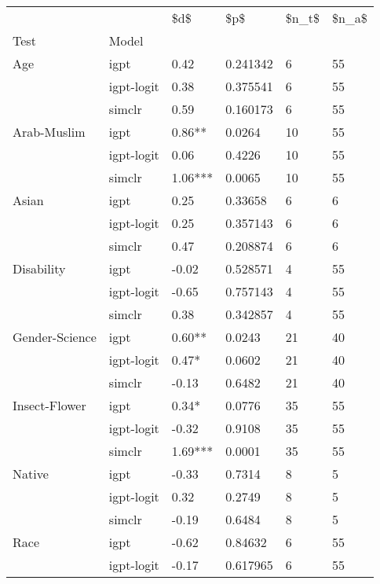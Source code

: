\begin{tabular}{llllll}
\toprule
       &        &      \$d\$ &         \$p\$ & \$n\_t\$ & \$n\_a\$ \\
Test & Model &          &             &       &       \\
\midrule
Age & igpt &     0.42 &    0.241342 &     6 &    55 \\
       & igpt-logit &     0.38 &    0.375541 &     6 &    55 \\
       & simclr &     0.59 &    0.160173 &     6 &    55 \\
Arab-Muslim & igpt &   0.86** &      0.0264 &    10 &    55 \\
       & igpt-logit &     0.06 &      0.4226 &    10 &    55 \\
       & simclr &  1.06*** &      0.0065 &    10 &    55 \\
Asian & igpt &     0.25 &     0.33658 &     6 &     6 \\
       & igpt-logit &     0.25 &    0.357143 &     6 &     6 \\
       & simclr &     0.47 &    0.208874 &     6 &     6 \\
Disability & igpt &    -0.02 &    0.528571 &     4 &    55 \\
       & igpt-logit &    -0.65 &    0.757143 &     4 &    55 \\
       & simclr &     0.38 &    0.342857 &     4 &    55 \\
Gender-Science & igpt &   0.60** &      0.0243 &    21 &    40 \\
       & igpt-logit &    0.47* &      0.0602 &    21 &    40 \\
       & simclr &    -0.13 &      0.6482 &    21 &    40 \\
Insect-Flower & igpt &    0.34* &      0.0776 &    35 &    55 \\
       & igpt-logit &    -0.32 &      0.9108 &    35 &    55 \\
       & simclr &  1.69*** &      0.0001 &    35 &    55 \\
Native & igpt &    -0.33 &      0.7314 &     8 &     5 \\
       & igpt-logit &     0.32 &      0.2749 &     8 &     5 \\
       & simclr &    -0.19 &      0.6484 &     8 &     5 \\
Race & igpt &    -0.62 &     0.84632 &     6 &    55 \\
       & igpt-logit &    -0.17 &    0.617965 &     6 &    55 \\

\end{tabular}

